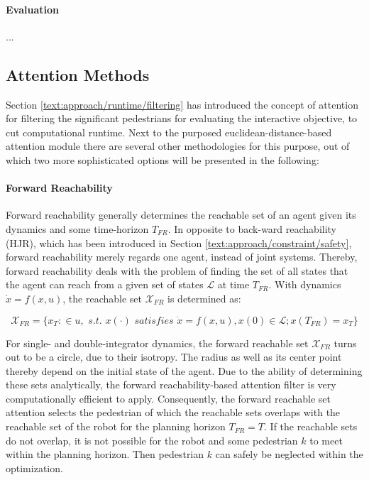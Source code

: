 \paragraph{Evaluation} ...

\subsection{Attention Methods}
Section \ref{text:approach/runtime/filtering} has introduced the concept of attention for filtering the significant pedestrians for evaluating the interactive objective, to cut computational runtime. Next to the purposed euclidean-distance-based attention module there are several other methodologies for this purpose, out of which two more sophisticated options will be presented in the following:

\paragraph{Forward Reachability}
Forward reachability generally determines the reachable set of an agent given its dynamics and some time-horizon $T_{FR}$. In opposite to back-ward reachability (\ac{HJR}), which has been introduced in Section \ref{text:approach/constraint/safety}, forward reachability merely regards one agent, instead of joint systems. Thereby, forward reachability deals with the problem of finding the set of all states that the agent can reach from a given set of states $\mathcal{L}$ at time $T_{FR}$. With dynamics $\dot{x} = f(x, u)$, the reachable set $\mathcal{X}_{FR}$ is determined as:

\begin{equation}
\mathcal{X}_{FR} = \{x_T: \in u, \textit{ s.t. } x(\cdot) \textit{ satisfies } \dot{x} = f(x, u), x(0) \in \mathcal{L}; x(T_{FR}) = x_T\}
\end{equation}
 
For single- and double-integrator dynamics, the forward reachable set $\mathcal{X}_{FR}$ turns out to be a circle, due to their isotropy. The radius as well as its center point thereby depend on the initial state of the agent. Due to the ability of determining these sets analytically, the forward reachability-based attention filter is very computationally efficient to apply.
\newline
Consequently, the forward reachable set attention selects the pedestrian of which the reachable sets overlaps with the reachable set of the robot for the planning horizon $T_{FR} = T$. If the reachable sets do not overlap, it is not possible for the robot and some pedestrian $k$ to meet within the planning horizon. Then pedestrian $k$ can safely be neglected within the optimization.

